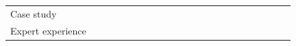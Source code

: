 \documentclass[english, 12pt, a4paper, sci, utf8, a-1b, online]{aaltothesis}
\begin{document}
{\begin{center}
\begin{longtable}{p{0.3\linewidth}p{0.6\linewidth}}
      Case study                                   & \textcite{how-developers-experience-team-performance} \newline \textcite{paw}                                                                                                                                                                                                                                                                                                                                                                                                                                                                                                                                                                                                                                                                                                                                                                                                                                                                      \\
      Expert experience                            & \textcite{entering-an-ecosystem} \newline \textcite{myers2016improving} \newline \textcite{macvean2016api} \newline \textcite{karpanoja2016exploring} \newline \textcite{nazariodetecting}                                                                                                                                                                                                                                                                                                                                                                                                                                                                                                                                                                                                                                                                                                                                                         \\

\end{longtable}
\end{center}}
\end{document}
